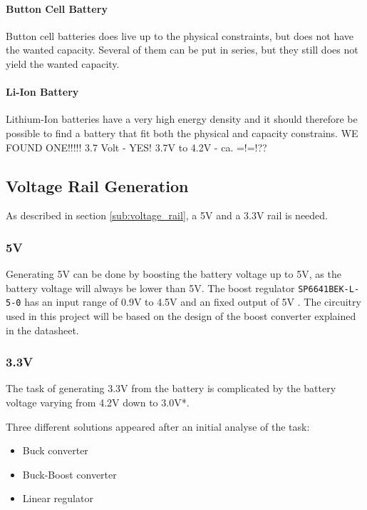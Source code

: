 \paragraph{Button Cell Battery}
Button cell batteries does live up to the physical constraints, but does not have the wanted capacity. 
Several of them can be put in series, but they still does not yield the wanted capacity.

\paragraph{Li-Ion Battery}
Lithium-Ion batteries have a very high energy density and it should therefore be possible to find a battery that fit both the physical and capacity constrains.
WE FOUND ONE!!!!!
3.7 Volt - YES!
3.7V to 4.2V - ca. =!=!??

\subsection{Voltage Rail Generation}
\label{sub:voltage_rail_generation}
As described in section \ref{sub:voltage_rail}, a 5V and a 3.3V rail is needed. 

\subsubsection*{5V}
Generating 5V can be done by boosting the battery voltage up to 5V, as the battery voltage will always be lower than 5V.
The boost regulator \texttt{SP6641BEK-L-5-0} has an input range of 0.9V to 4.5V and an fixed output of 5V \cite{sp6641b}.
The circuitry used in this project will be based on the design of the boost converter explained in the datasheet.

\subsubsection*{3.3V}
The task of generating 3.3V from the battery is complicated by the battery voltage varying from 4.2V down to 3.0V*.

Three different solutions appeared after an initial analyse of the task:

\begin{itemize}
	\item Buck converter
	\item Buck-Boost converter
	\item Linear regulator
\end{itemize}

